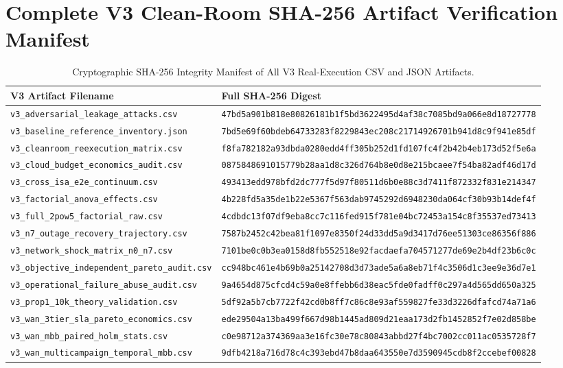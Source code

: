 \documentclass[10pt,journal,compsoc]{IEEEtran}
\begin{document}
\section{Complete V3 Clean-Room SHA-256 Artifact Verification Manifest}
\begin{table}[!h]
\centering
\caption{Cryptographic SHA-256 Integrity Manifest of All V3 Real-Execution CSV and JSON Artifacts.}
\label{tab:sha_manifest}
\scriptsize
\begin{tabular}{ll}
\toprule
\textbf{V3 Artifact Filename} & \textbf{Full SHA-256 Digest} \\
\midrule
\texttt{v3\_adversarial\_leakage\_attacks.csv} & \texttt{47bd5a901b818e80826181b1f5bd3622495d4af38c7085bd9a066e8d18727778} \\
\texttt{v3\_baseline\_reference\_inventory.json} & \texttt{7bd5e69f60bdeb64733283f8229843ec208c21714926701b941d8c9f941e85df} \\
\texttt{v3\_cleanroom\_reexecution\_matrix.csv} & \texttt{f8fa782182a93dbda0280edd4ff305b252d1fd107fc4f2b42b4eb173d52f5e6a} \\
\texttt{v3\_cloud\_budget\_economics\_audit.csv} & \texttt{0875848691015779b28aa1d8c326d764b8e0d8e215bcaee7f54ba82adf46d17d} \\
\texttt{v3\_cross\_isa\_e2e\_continuum.csv} & \texttt{493413edd978bfd2dc777f5d97f80511d6b0e88c3d7411f872332f831e214347} \\
\texttt{v3\_factorial\_anova\_effects.csv} & \texttt{4b228fd5a35de1b22e5367f563dab9745292d6948230da064cf30b93b14def4f} \\
\texttt{v3\_full\_2pow5\_factorial\_raw.csv} & \texttt{4cdbdc13f07df9eba8cc7c116fed915f781e04bc72453a154c8f35537ed73413} \\
\texttt{v3\_n7\_outage\_recovery\_trajectory.csv} & \texttt{7587b2452c42bea81f1097e8350f24d33dd5a9d3417d76ee51303ce86356f886} \\
\texttt{v3\_network\_shock\_matrix\_n0\_n7.csv} & \texttt{7101be0c0b3ea0158d8fb552518e92facdaefa704571277de69e2b4df23b6c0c} \\
\texttt{v3\_objective\_independent\_pareto\_audit.csv} & \texttt{cc948bc461e4b69b0a25142708d3d73ade5a6a8eb71f4c3506d1c3ee9e36d7e1} \\
\texttt{v3\_operational\_failure\_abuse\_audit.csv} & \texttt{9a4654d875cfcd4c59a0e8ffebb6d38eac5fde0fadff0c297a4d565dd650a325} \\
\texttt{v3\_prop1\_10k\_theory\_validation.csv} & \texttt{5df92a5b7cb7722f42cd0b8ff7c86c8e93af559827fe33d3226dfafcd74a71a6} \\
\texttt{v3\_wan\_3tier\_sla\_pareto\_economics.csv} & \texttt{ede29504a13ba499f667d98b1445ad809d21eaa173d2fb1452852f7e02d858be} \\
\texttt{v3\_wan\_mbb\_paired\_holm\_stats.csv} & \texttt{c0e98712a374369aa3e16fc30e78c80843abbd27f4bc7002cc011ac0535728f7} \\
\texttt{v3\_wan\_multicampaign\_temporal\_mbb.csv} & \texttt{9dfb4218a716d78c4c393ebd47b8daa643550e7d3590945cdb8f2ccebef00828} \\
\bottomrule
\end{tabular}
\end{table}
\end{document}
